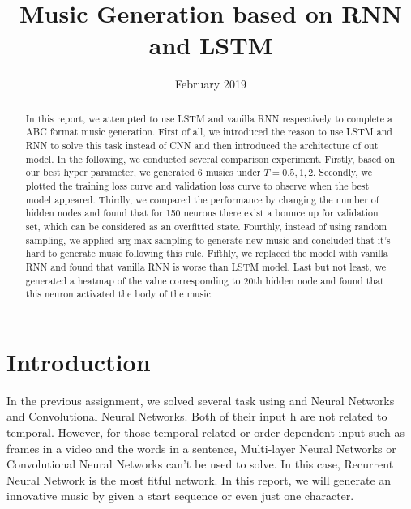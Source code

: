 \documentclass{article}
\title{Music Generation based on RNN and LSTM}
\date{February 2019}
\begin{document}
\maketitle
\begin{abstract}
In this report, we attempted  to use LSTM and vanilla RNN respectively to complete a ABC format music generation. First of all, we introduced the reason to use LSTM and RNN to solve this task instead of CNN and then introduced the architecture of out model. In the following, we conducted several comparison experiment. Firstly, based on our best hyper parameter, we generated 6  musics under $T=0.5,1,2$. Secondly, we plotted the training loss curve and validation loss curve to observe when the best model appeared. Thirdly, we compared the performance by changing the number of hidden nodes and found that for 150 neurons there exist a bounce up for validation set, which can be considered as an overfitted state. Fourthly, instead of using random sampling, we applied arg-max sampling to generate new music and concluded that it's hard to generate music following this rule. Fifthly, we replaced the model with vanilla RNN and found that vanilla RNN is worse than LSTM model. Last but not least, we generated a heatmap of the value corresponding to 20th hidden node and found that this neuron activated the body of the music.
\end{abstract}



\section{Introduction}
In the previous assignment, we solved several task using and Neural Networks and Convolutional Neural Networks. Both of their input h are not related to temporal. However, for those temporal related or order dependent input such as frames in a video and the words in a sentence, Multi-layer Neural Networks or Convolutional Neural Networks can't be used to solve. In this case, Recurrent Neural Network is the most fitful network. In this report, we will generate an innovative music by given a start sequence or even just one character.
\end{document}
